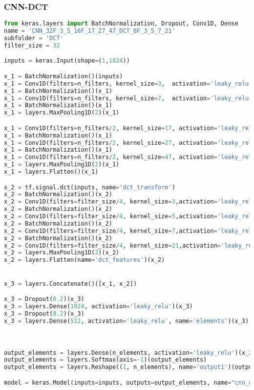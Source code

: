 \hypertarget{cnn-dct}{%
\subsubsection{CNN-DCT}\label{cnn-dct}}

\begin{lstlisting}[language=Python]
from keras.layers import BatchNormalization, Dropout, Conv1D, Dense
name = 'CNN_32F_3_5_16F_17_27_47_DCT_8F_3_5_7_21'
subfolder = 'DCT'
filter_size = 32

inputs = keras.Input(shape=(1,1024))

x_1 = BatchNormalization()(inputs)
x_1 = Conv1D(filters=n_filters, kernel_size=3,  activation='leaky_relu', data_format='channels_first')(x_1)
x_1 = BatchNormalization()(x_1)
x_1 = Conv1D(filters=n_filters, kernel_size=7,  activation='leaky_relu', data_format='channels_first')(x_1)
x_1 = BatchNormalization()(x_1)
x_1 = layers.MaxPooling1D(2)(x_1)

x_1 = Conv1D(filters=n_filters/2, kernel_size=17, activation='leaky_relu', data_format='channels_first')(x_1)
x_1 = BatchNormalization()(x_1)
x_1 = Conv1D(filters=n_filters/2, kernel_size=27, activation='leaky_relu', data_format='channels_first')(x_1)
x_1 = BatchNormalization()(x_1)
x_1 = Conv1D(filters=n_filters/2, kernel_size=47, activation='leaky_relu', data_format='channels_first')(x_1)
x_1 = layers.MaxPooling1D(2)(x_1)
x_1 = layers.Flatten()(x_1)

x_2 = tf.signal.dct(inputs, name='dct_transform')
x_2 = BatchNormalization()(x_2)
x_2 = Conv1D(filters=filter_size/4, kernel_size=3,activation='leaky_relu', data_format='channels_first')(x_2)
x_2 = BatchNormalization()(x_2)
x_2 = Conv1D(filters=filter_size/4, kernel_size=5,activation='leaky_relu', data_format='channels_first')(x_2)
x_2 = BatchNormalization()(x_2)
x_2 = Conv1D(filters=filter_size/4, kernel_size=7,activation='leaky_relu', data_format='channels_first')(x_2)
x_2 = BatchNormalization()(x_2)
x_2 = Conv1D(filters=filter_size/4, kernel_size=21,activation='leaky_relu',data_format='channels_first')(x_2)
x_2 = layers.MaxPooling1D(2)(x_2)
x_2 = layers.Flatten(name='dct_features')(x_2)


x_3 = layers.Concatenate()([x_1, x_2])

x_3 = Dropout(0.2)(x_3)
x_3 = layers.Dense(1024, activation='leaky_relu')(x_3)
x_3 = Dropout(0.2)(x_3)
x_3 = layers.Dense(512, activation='leaky_relu', name='elements')(x_3)



output_elements = layers.Dense(n_elements, activation='leaky_relu')(x_3)
output_elements = layers.Softmax(axis=-1)(output_elements)
output_elements = layers.Reshape((1, n_elements), name='output1')(output_elements)

model = keras.Model(inputs=inputs, outputs=output_elements, name="cnn_dct")
\end{lstlisting}

